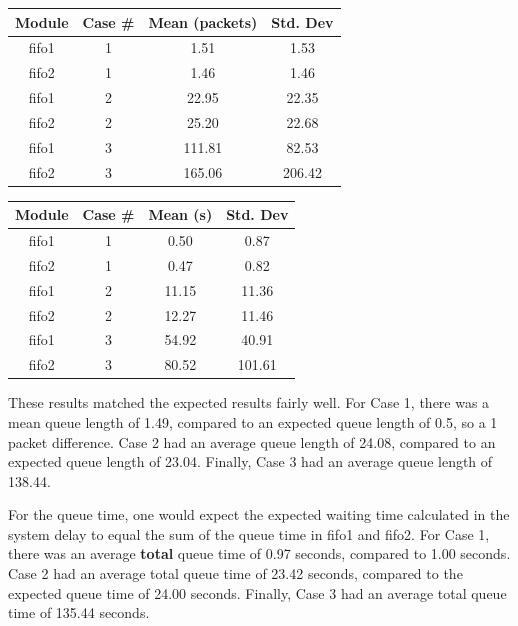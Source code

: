 \documentclass{article}
\begin{document}
\vspace{.25cm}
\begin{minipage}{0.5\textwidth}
	\centering
	\begin{tabular}{|c|c|c|c|} \hline
		\textbf{Module} & \textbf{Case \#} & \textbf{Mean (packets)} & \textbf{Std. Dev} \\ \hline
	 fifo1 & 1 & 1.51 & 1.53 \\ \hline
	 fifo2 & 1 & 1.46 & 1.46 \\ \hline
	 fifo1 & 2 & 22.95 & 22.35 \\ \hline
	 fifo2 & 2 & 25.20 & 22.68 \\ \hline
	 fifo1 & 3 & 111.81 & 82.53 \\ \hline
	 fifo2 & 3 & 165.06 & 206.42 \\ \hline
	\end{tabular}
	\label{qlen}
\end{minipage}  
\begin{minipage}{0.5\textwidth}
	\centering
	\begin{tabular}{|c|c|c|c|} \hline
		\textbf{Module} & \textbf{Case \#} & \textbf{Mean (s)} & \textbf{Std. Dev} \\ \hline
		fifo1 & 1 & 0.50 & 0.87 \\ \hline
		fifo2 & 1 & 0.47 & 0.82 \\ \hline
		fifo1 & 2 & 11.15 & 11.36 \\ \hline
		fifo2 & 2 & 12.27 & 11.46 \\ \hline
		fifo1 & 3 & 54.92 & 40.91 \\ \hline
		fifo2 & 3 & 80.52 & 101.61 \\ \hline
	\end{tabular}
	\label{qTime}
\end{minipage}
\vspace{.25cm}

These results matched the expected results fairly well.
For Case 1, there was a mean queue length of 1.49, compared to an expected queue length of 0.5, so a 1 packet difference.
Case 2 had an average queue length of 24.08, compared to an expected queue length of 23.04.
Finally, Case 3 had an average queue length of 138.44.

For the queue time, one would expect the expected waiting time calculated in the system delay to equal the sum of the queue time in fifo1 and fifo2.
For Case 1, there was an average \textbf{total} queue time of 0.97 seconds, compared to 1.00 seconds.
Case 2 had an average total queue time of 23.42 seconds, compared to the expected queue time of 24.00 seconds.
Finally, Case 3 had an average total queue time of 135.44 seconds.
\end{document}
